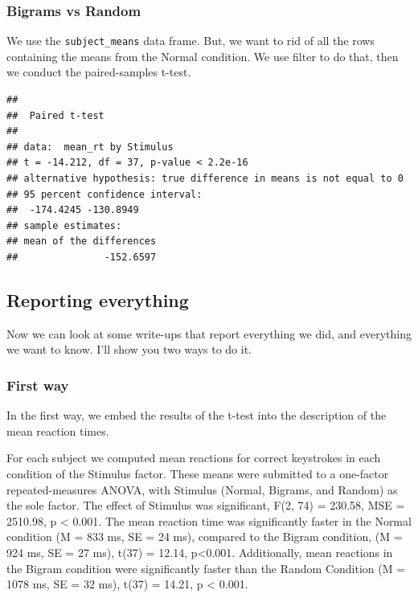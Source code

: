 \documentclass[]{book}
\newenvironment{Shaded}{\begin{snugshade}}{\end{snugshade}}
\newcommand{\KeywordTok}[1]{\textcolor[rgb]{0.13,0.29,0.53}{\textbf{#1}}}
\newcommand{\DataTypeTok}[1]{\textcolor[rgb]{0.13,0.29,0.53}{#1}}
\newcommand{\StringTok}[1]{\textcolor[rgb]{0.31,0.60,0.02}{#1}}
\newcommand{\OtherTok}[1]{\textcolor[rgb]{0.56,0.35,0.01}{#1}}
\newcommand{\OperatorTok}[1]{\textcolor[rgb]{0.81,0.36,0.00}{\textbf{#1}}}
\newcommand{\NormalTok}[1]{#1}
\begin{document}
\subsubsection{Bigrams vs Random}\label{bigrams-vs-random}

We use the \texttt{subject\_means} data frame. But, we want to rid of
all the rows containing the means from the Normal condition. We use
filter to do that, then we conduct the paired-samples t-test.

\begin{Shaded}
\end{Shaded}

\begin{verbatim}
## 
##  Paired t-test
## 
## data:  mean_rt by Stimulus
## t = -14.212, df = 37, p-value < 2.2e-16
## alternative hypothesis: true difference in means is not equal to 0
## 95 percent confidence interval:
##  -174.4245 -130.8949
## sample estimates:
## mean of the differences 
##               -152.6597
\end{verbatim}

\subsection{Reporting everything}\label{reporting-everything}

Now we can look at some write-ups that report everything we did, and
everything we want to know. I'll show you two ways to do it.

\subsubsection{First way}\label{first-way}

In the first way, we embed the results of the t-test into the
description of the mean reaction times.

For each subject we computed mean reactions for correct keystrokes in
each condition of the Stimulus factor. These means were submitted to a
one-factor repeated-measures ANOVA, with Stimulus (Normal, Bigrams, and
Random) as the sole factor. The effect of Stimulus was significant, F(2,
74) = 230.58, MSE = 2510.98, p \textless{} 0.001. The mean reaction time
was significantly faster in the Normal condition (M = 833 ms, SE = 24
ms), compared to the Bigram condition, (M = 924 ms, SE = 27 ms), t(37) =
12.14, p\textless{}0.001. Additionally, mean reactions in the Bigram
condition were significantly faster than the Random Condition (M = 1078
ms, SE = 32 ms), t(37) = 14.21, p \textless{} 0.001.
\end{document}
